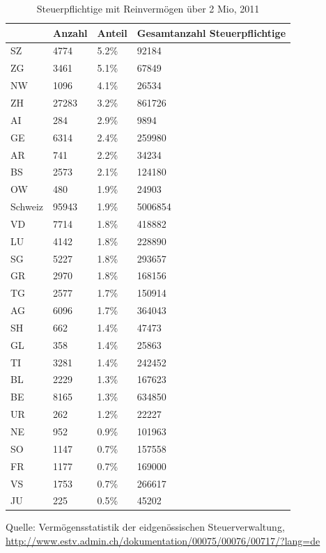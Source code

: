 \documentclass[a4paper, 12pt,liststotoc]{scrartcl}
\numberwithin{equation}{section}
\begin{document}
\begin{table}
\centering
\footnotesize
\caption{Steuerpflichtige mit Reinvermögen über 2 Mio, 2011}
\begin{tabular}{L{2.2cm}L{2.5cm}L{2.5cm}L{3cm}}
\toprule
~ & Anzahl & Anteil & Gesamtanzahl Steuerpflichtige\\
\midrule
SZ & 4774 & 5.2\% & 92184\\
ZG & 3461 & 5.1\% & 67849\\
NW & 1096 & 4.1\% & 26534\\
ZH & 27283 & 3.2\% & 861726\\
AI & 284 & 2.9\% & 9894\\
GE & 6314 & 2.4\% & 259980\\
AR & 741 & 2.2\% & 34234\\
BS & 2573 & 2.1\% & 124180\\
OW & 480 & 1.9\% & 24903\\
\midrule
Schweiz & 95943 & 1.9\% &
5006854\\
\midrule
VD & 7714 & 1.8\% & 418882\\
LU & 4142 & 1.8\% & 228890\\
SG & 5227 & 1.8\% & 293657\\
GR & 2970 & 1.8\% & 168156\\
TG & 2577 & 1.7\% & 150914\\
AG & 6096 & 1.7\% & 364043\\
SH & 662 & 1.4\% & 47473\\
GL & 358 & 1.4\% & 25863\\
TI & 3281 & 1.4\% & 242452\\
BL & 2229 & 1.3\% & 167623\\
\midrule
BE & 8165 & 1.3\% &
634850\\
\midrule
UR & 262 & 1.2\% & 22227\\
NE & 952 & 0.9\% & 101963\\
SO & 1147 & 0.7\% & 157558\\
FR & 1177 & 0.7\% & 169000\\
VS & 1753 & 0.7\% & 266617\\
JU & 225 & 0.5\% & 45202\\
\bottomrule
\end{tabular}
\begin{tablenotes}
\small
\item Quelle: Vermögensstatistik der eidgenössischen Steuerverwaltung, \url{http://www.estv.admin.ch/dokumentation/00075/00076/00717/?lang=de}
\end{tablenotes}
\label{tab:steuerpflichtige}
\end{table}

\newpage
\printbibliography[heading=bibintoc]
\end{document}
